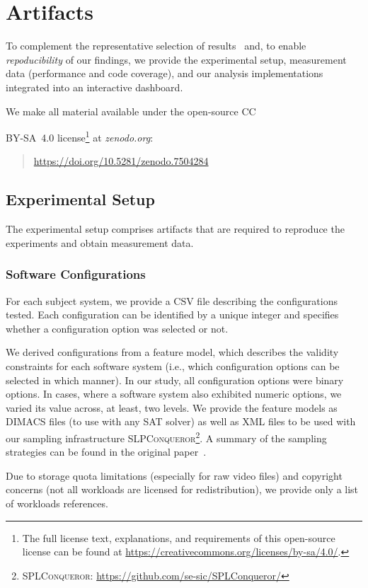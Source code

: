 \section{Artifacts}
To complement the representative selection of results~\cite{muhlbauer_workload_2023} and, to enable \textit{repoducibility} of our findings, we provide the experimental setup, measurement data (performance and code coverage), and our analysis implementations integrated into an interactive dashboard.

We make all material available under the open-source CC~{BY-SA~4.0 license\footnote{The full license text, explanations, and requirements of this open-source license can be found at \url{https://creativecommons.org/licenses/by-sa/4.0/}.} at \textit{zenodo.org}:
\begin{quotation}
	\url{https://doi.org/10.5281/zenodo.7504284}
\end{quotation}


\subsection{Experimental Setup}
The experimental setup comprises artifacts that are required to reproduce the experiments and obtain measurement data. 

\subsubsection{Software Configurations} For each subject system, we provide  a CSV file describing the configurations tested. Each configuration can be identified by a unique integer and specifies whether a configuration option was selected or not. 

We derived configurations from a feature model, which describes the validity constraints for each software system (i.e., which configuration options can be selected in which manner). In our study, all configuration options were binary options. In cases, where a software system also exhibited numeric options, we varied its value across, at least, two levels. We provide the feature models as DIMACS files (to use with any SAT solver) as well as XML files to be used with our sampling infrastructure \textsc{SLPConqueror}\footnote{\textsc{SPLConqueror}: \url{https://github.com/se-sic/SPLConqueror/}}. A summary of the sampling strategies can be found in the original paper~\cite{muhlbauer_workload_2023}.

Due to storage quota limitations (especially for raw video files) and copyright concerns (not all workloads are licensed for redistribution), we provide only a list of workloads references. 

}
